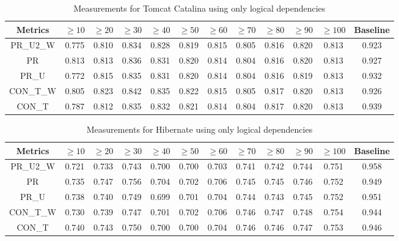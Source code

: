 \documentclass[runningheads]{comsis2}
\begin{document}
\begin{table}[!h]
\setlength\tabcolsep{3.5pt}
\caption{Measurements for Tomcat Catalina using only logical dependencies}
\label{tab:measurementshistory:tomcat}
\centering
\begin{tabular}{|c|cccccccccc|c|}
\hline
Metrics &	$\geq10$	&	$\geq20$		&	$\geq30$		&	$\geq40$		&	$\geq50$		&	$\geq60$		&	$\geq70$		&	$\geq80$		&	$\geq90$		&	$\geq100$		&	Baseline \\
\hline

PR\_U2\_W	&	0.775	&	0.810	&	0.834	&	0.828	&	0.819	&	0.815	&	0.805	&	0.816	&	0.820	&	0.813	&	0.923	\\
PR	&	0.813	&	0.813	&	0.836	&	0.831	&	0.820	&	0.814	&	0.804	&	0.816	&	0.820	&	0.813	&	0.927	\\
PR\_U	&	0.772	&	0.815	&	0.835	&	0.831	&	0.820	&	0.814	&	0.804	&	0.816	&	0.819	&	0.813	&	0.932	\\
CON\_T\_W	&	0.805	&	0.823	&	0.842	&	0.835	&	0.822	&	0.815	&	0.805	&	0.817	&	0.820	&	0.813	&	0.926	\\
CON\_T	&	0.787	&	0.812	&	0.835	&	0.832	&	0.821	&	0.814	&	0.804	&	0.817	&	0.820	&	0.813	&	0.939	\\

				
\hline
\end{tabular}

\end{table}


\begin{table}[!h]
\setlength\tabcolsep{3.5pt}
\caption{Measurements for Hibernate using only logical dependencies}
\label{tab:measurementshistory:hibernate}
\centering
\begin{tabular}{|c|cccccccccc|c|}
\hline
Metrics &	$\geq10$	&	$\geq20$		&	$\geq30$		&	$\geq40$		&	$\geq50$		&	$\geq60$		&	$\geq70$		&	$\geq80$		&	$\geq90$		&	$\geq100$		&	Baseline \\
\hline

PR\_U2\_W	&	0.721	&	0.733	&	0.743	&	0.700	&	0.700	&	0.703	&	0.741	&	0.742	&	0.744	&	0.751	&	0.958	\\
PR	&	0.735	&	0.747	&	0.756	&	0.704	&	0.702	&	0.706	&	0.745	&	0.745	&	0.746	&	0.752	&	0.949	\\
PR\_U	&	0.738	&	0.740	&	0.749	&	0.699	&	0.701	&	0.704	&	0.744	&	0.743	&	0.745	&	0.752	&	0.951	\\
CON\_T\_W	&	0.730	&	0.739	&	0.747	&	0.701	&	0.702	&	0.706	&	0.746	&	0.747	&	0.748	&	0.754	&	0.944	\\
CON\_T	&	0.740	&	0.743	&	0.750	&	0.700	&	0.700	&	0.704	&	0.746	&	0.746	&	0.747	&	0.753	&	0.946	\\


\hline
\end{tabular}
\end{table}
\end{document}
